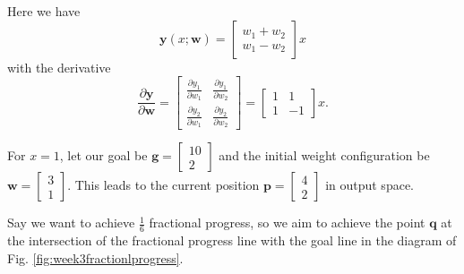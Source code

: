 \documentclass{article}
\let\vec\mathbf
\begin{document}
Here we have
\begin{equation*}
    \vec{y}(x; \vec{w}) = 
    \begin{bmatrix}
        w_1 + w_2 \\
        w_1 - w_2
    \end{bmatrix}
    x
\end{equation*}
with the derivative
\begin{equation*}
    \frac{\partial \vec{y}}{\partial \vec{w}}
    =
    \begin{bmatrix}
        \frac{\partial y_1}{\partial w_1} & \frac{\partial y_1}{\partial w_2} \\
        \frac{\partial y_2}{\partial w_1} & \frac{\partial y_2}{\partial w_2}
    \end{bmatrix}
    =
    \begin{bmatrix}
        1 & 1 \\
        1 & -1
    \end{bmatrix}
    x.
\end{equation*}

For
$x = 1$,
let our goal be $\vec{g} = \begin{bmatrix} 10 \\ 2 \end{bmatrix}$
and the initial weight configuration be
$\vec{w} = \begin{bmatrix} 3 \\ 1 \end{bmatrix}$.
This leads to the current position $\vec{p} = \begin{bmatrix} 4 \\ 2 \end{bmatrix}$ in output space.

Say we want to achieve $\frac{1}{6}$ fractional progress, so we aim to achieve the point $\vec{q}$ at the intersection of the fractional progress line with the goal line in the diagram of Fig. \ref{fig:week3fractionlprogress}. 
\end{document}

